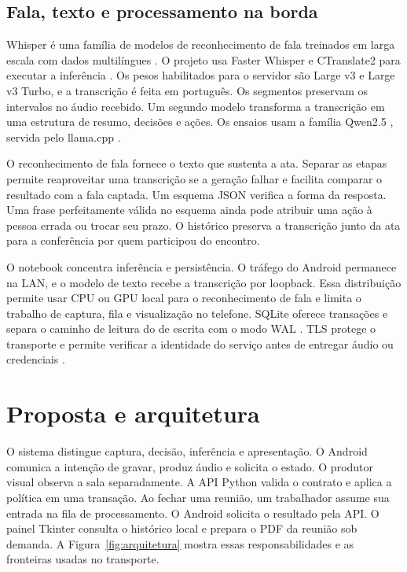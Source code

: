 \documentclass[12pt]{article}
\begin{document}
\subsection{Fala, texto e processamento na borda}

Whisper é uma família de modelos de reconhecimento de fala treinados em larga escala com dados multilíngues \cite{radford2023}. O projeto usa Faster Whisper e CTranslate2 para executar a inferência \cite{fasterwhisper}. Os pesos habilitados para o servidor são Large v3 e Large v3 Turbo, e a transcrição é feita em português. Os segmentos preservam os intervalos no áudio recebido. Um segundo modelo transforma a transcrição em uma estrutura de resumo, decisões e ações. Os ensaios usam a família Qwen2.5 \cite{qwen2024}, servida pelo llama.cpp \cite{llamacpp}.

O reconhecimento de fala fornece o texto que sustenta a ata. Separar as etapas permite reaproveitar uma transcrição se a geração falhar e facilita comparar o resultado com a fala captada. Um esquema JSON verifica a forma da resposta. Uma frase perfeitamente válida no esquema ainda pode atribuir uma ação à pessoa errada ou trocar seu prazo. O histórico preserva a transcrição junto da ata para a conferência por quem participou do encontro.

O notebook concentra inferência e persistência. O tráfego do Android permanece na LAN, e o modelo de texto recebe a transcrição por loopback. Essa distribuição permite usar CPU ou GPU local para o reconhecimento de fala e limita o trabalho de captura, fila e visualização no telefone. SQLite oferece transações e separa o caminho de leitura do de escrita com o modo WAL \cite{sqlitewal}. TLS protege o transporte e permite verificar a identidade do serviço antes de entregar áudio ou credenciais \cite{rfc8446}.

\section{Proposta e arquitetura}

O sistema distingue captura, decisão, inferência e apresentação. O Android comunica a intenção de gravar, produz áudio e solicita o estado. O produtor visual observa a sala separadamente. A API Python valida o contrato e aplica a política em uma transação. Ao fechar uma reunião, um trabalhador assume sua entrada na fila de processamento. O Android solicita o resultado pela API. O painel Tkinter consulta o histórico local e prepara o PDF da reunião sob demanda. A Figura~\ref{fig:arquitetura} mostra essas responsabilidades e as fronteiras usadas no transporte.
\end{document}
